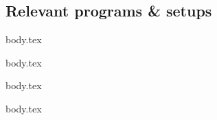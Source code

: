\subsection{Relevant programs \& setups}

\ifdefined\wslRelevantWindowsTerminal
{body.tex}
\fi

\ifdefined\wslRelevantDocker
{body.tex}
\fi

\ifdefined\wslPackages
{body.tex}
\fi

\ifdefined\wslExtras
{body.tex}
\fi